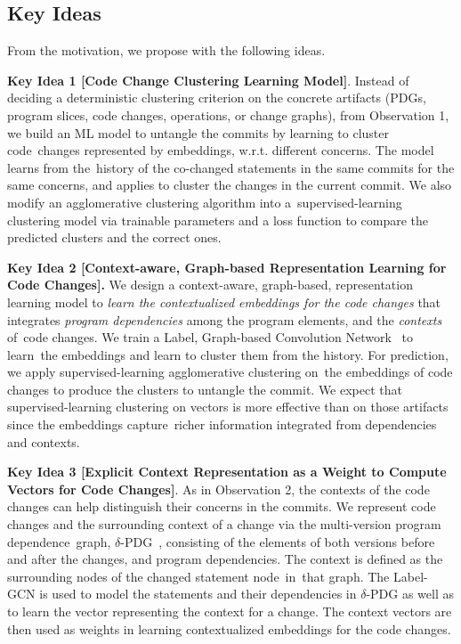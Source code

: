 \subsection{Key Ideas}
\label{ideas:sec}

From the motivation, we propose {\tool} with the following
ideas.


\vspace{2pt}
{\bf Key Idea 1 [Code Change Clustering Learning Model]}. Instead of
deciding a deterministic clustering criterion on the concrete
artifacts (PDGs, program slices, code changes, operations, or change
graphs), from Observation 1, we build an ML model to untangle the
commits by learning to cluster code~changes represented by embeddings,
w.r.t. different concerns. The model learns from the~history of the
co-changed statements in the same commits for the same concerns, and
applies to cluster the changes in the current commit.  We also modify
an agglomerative clustering algorithm into a~super\-vised-learning
clustering model via trainable parameters and a loss function to
compare the predicted clusters and the correct ones.

\vspace{3pt} {\bf Key Idea 2 [Context-aware, Graph-based
    Representation Learning for Code Changes].} We design a
context-aware, graph-based, representation learning model to {\em
  learn the contextualized embeddings for the code changes}
that integrates {\em program dependencies} among the program elements,
and the {\em contexts} of~code changes. We train a Label, Graph-based
Convolution Network~\cite{label-gcn} to learn~the embeddings and learn
to cluster them from the history.
For prediction, we apply supervised-learning agglomerative clustering
on~the embeddings of code changes to produce the clusters to untangle
the commit. We expect that supervised-learning clustering on vectors
is more effective than on those artifacts since the embeddings
capture~richer information integrated from dependencies and
contexts.

\vspace{3pt}
{\bf Key Idea 3 [Explicit Context Representation as a Weight to
    Compute Vectors for Code Changes]}. As in Observation 2, the
contexts of the code changes can help distinguish their concerns in
the commits. We represent code changes and the surrounding context of
a change via the multi-version program dependence~graph,
$\delta$-PDG~\cite{flexeme-fse20}, consisting of the elements of both
versions before and after the changes, and program dependencies. The
context is defined as the surrounding nodes of the changed statement
node~in~that graph. The Label-GCN is used to model the statements and
their dependencies in $\delta$-PDG as well as to learn the vector
representing the context for a change. The context vectors are then
used as weights in learning contextualized embeddings for the code
changes.

